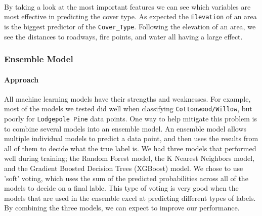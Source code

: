 \documentclass[11pt]{article}
\begin{document}
    \begin{center}
    \end{center}
    { \hspace*{\fill} \\}
    
    By taking a look at the most important features we can see which
variables are most effective in predicting the cover type. As expected
the \texttt{Elevation} of an area is the biggest predictor of the
\texttt{Cover\_Type}. Following the elevation of an area, we see the
distances to roadways, fire points, and water all having a large effect.

    \subsubsection{Ensemble Model}\label{ensemble-model}

    \paragraph{Approach}\label{approach}

All machine learning models have their strengths and weaknesses. For
example, most of the models we tested did well when classifying
\texttt{Cottonwood/Willow}, but poorly for \texttt{Lodgepole\ Pine} data
points. One way to help mitigate this problem is to combine several
models into an ensemble model. An ensemble model allows multiple
individual models to predict a data point, and then uses the results
from all of them to decide what the true label is. We had three models
that performed well during training; the Random Forest model, the K
Nearest Neighbors model, and the Gradient Boosted Decision Trees
(XGBoost) model. We chose to use 'soft' voting, which uses the sum of
the predicted probabilities across all of the models to decide on a
final lable. This type of voting is very good when the models that are
used in the ensemble excel at predicting different types of labels. By
combining the three models, we can expect to improve our performance.
\end{document}
